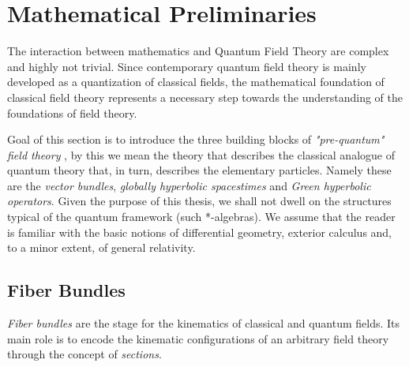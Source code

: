 \documentclass[Main]{subfiles}
\begin{document}
\chapter{Mathematical Preliminaries}
	The interaction between mathematics and Quantum Field Theory are complex and highly not trivial.
	Since contemporary quantum field theory is mainly developed as a quantization of classical fields, the mathematical foundation of classical field theory represents a necessary step towards the understanding of the foundations of field theory.
	
	Goal of this section is to introduce the three  building blocks of \emph{"pre-quantum" field theory} , by this we mean the theory that describes the classical analogue of quantum theory that, in turn, describes the elementary particles.
	Namely these are the \emph{vector bundles}, \emph{globally hyperbolic spacestimes} and \emph{Green hyperbolic operators}.
	Given the purpose of this thesis, we shall not dwell on the structures typical of the quantum framework (such *-algebras).
	We assume that the reader is familiar with the basic notions of differential geometry, exterior calculus and, to a minor extent, of general relativity.
	\section{Fiber Bundles}
		\emph{Fiber bundles} are the stage for the kinematics of classical and quantum fields.
		Its main role is to encode the kinematic configurations of an arbitrary field theory through the concept of
		\emph{sections}.
		
\end{document}
